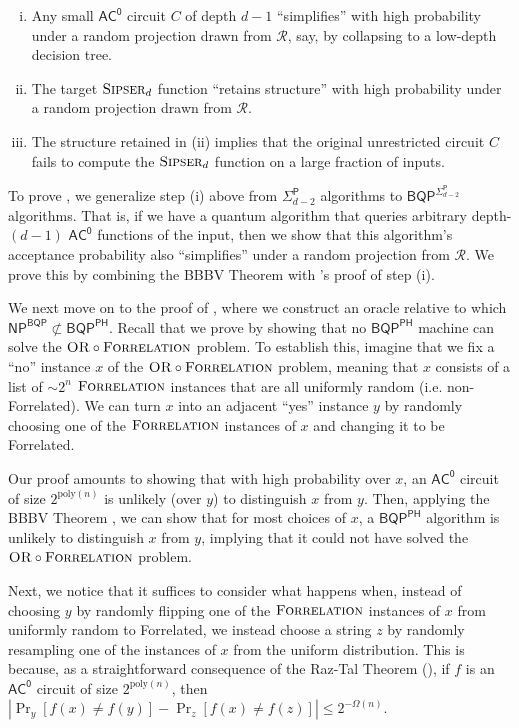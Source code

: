 \documentclass[10pt,a4paper]{article}
\newcommand{\poly}{\mathrm{poly}}
\newcommand{\Sipser}{\normalfont\textsc{Sipser}}
\newcommand{\OR}{\normalfont\textsc{OR}}
\newcommand{\Forrelation}{\normalfont\textsc{Forrelation}}
\begin{document}
\begin{enumerate}[(i)]
\item Any small $\mathsf{AC^0}$ circuit $C$ of depth $d-1$ ``simplifies'' with high probability under a random projection drawn from $\mathcal{R}$, say, by collapsing to a low-depth decision tree.
\item The target $\Sipser_d$ function ``retains structure''  with high probability under a random projection drawn from $\mathcal{R}$.
\item The structure retained in (ii) implies that the original unrestricted circuit $C$ fails to compute the $\Sipser_d$ function on a large fraction of inputs.
\end{enumerate}

To prove , we generalize step (i) above from $\mathsf{\Sigma}_{d-2}^\mathsf{P}$ algorithms to $\mathsf{BQP}^{\mathsf{\Sigma}_{d-2}^\mathsf{P}}$ algorithms. That is, if we have a quantum algorithm that queries arbitrary depth-$(d-1)$ $\mathsf{AC^0}$ functions of the input, then we show that this algorithm's acceptance probability also ``simplifies'' under a random projection from $\mathcal{R}$.  We prove this by combining the BBBV Theorem \cite{BBBV97} with \cite{HRST17}'s proof of step (i).

\bigskip

We next move on to the proof of , where we construct an oracle relative to which $\mathsf{NP^{BQP}}\not\subset\mathsf{BQP^{PH}}$. Recall that we prove  by showing that no $\mathsf{BQP}^\mathsf{PH}$ machine can solve the $\OR \circ \Forrelation$ problem. To establish this, imagine that we fix a ``no'' instance $x$ of the $\OR \circ \Forrelation$ problem, meaning that $x$ consists of a list of $\sim 2^n$ $\Forrelation$ instances that are all uniformly random (i.e. non-Forrelated). We can turn $x$ into an adjacent ``yes'' instance $y$ by randomly choosing one of the $\Forrelation$ instances of $x$ and changing it to be Forrelated.

Our proof amounts to showing that with high probability over $x$, an $\mathsf{AC^0}$ circuit of size $2^{\poly(n)}$ is unlikely (over $y$) to distinguish $x$ from $y$. Then, applying the BBBV Theorem \cite{BBBV97}, we can show that for most choices of $x$, a $\mathsf{BQP}^\mathsf{PH}$ algorithm is unlikely to distinguish $x$ from $y$, implying that it could not have solved the $\OR \circ \Forrelation$ problem.

Next, we notice that it suffices to consider what happens when, instead of choosing $y$ by randomly flipping one of the $\Forrelation$ instances of $x$ from uniformly random to Forrelated, we instead choose a string $z$ by randomly resampling one of the instances of $x$ from the uniform distribution. This is because, as a straightforward consequence of the Raz-Tal Theorem (), if $f$ is an $\mathsf{AC^0}$ circuit of size $2^{\poly(n)}$, then $\left|\Pr_y[f(x) \neq f(y)] - \Pr_{z}[f(x) \neq f(z)] \right| \le 2^{-\Omega(n)}$.
\end{document}
